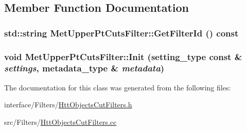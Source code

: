 \subsection{Member Function Documentation}
\hypertarget{classMetUpperPtCutsFilter_aab40830d4ab4c77cea3a90ac3d2fcf04}{
\subsubsection[{GetFilterId}]{\setlength{\rightskip}{0pt plus 5cm}std::string MetUpperPtCutsFilter::GetFilterId () const}}
\label{classMetUpperPtCutsFilter_aab40830d4ab4c77cea3a90ac3d2fcf04}
\hypertarget{classMetUpperPtCutsFilter_a6199686004b45bee571b5f802993b9fe}{
\subsubsection[{Init}]{\setlength{\rightskip}{0pt plus 5cm}void MetUpperPtCutsFilter::Init (setting\_\-type const \& {\em settings}, \/  metadata\_\-type \& {\em metadata})}}
\label{classMetUpperPtCutsFilter_a6199686004b45bee571b5f802993b9fe}


The documentation for this class was generated from the following files:\begin{DoxyCompactItemize}
\item 
interface/Filters/\hyperlink{HttObjectsCutFilters_8h}{HttObjectsCutFilters.h}\item 
src/Filters/\hyperlink{HttObjectsCutFilters_8cc}{HttObjectsCutFilters.cc}\end{DoxyCompactItemize}
